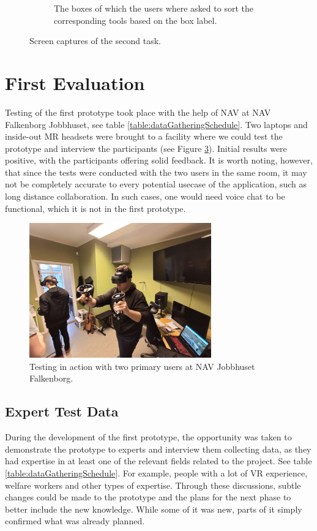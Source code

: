 \begin{figure}[]
\begin{subfigure}[b]{0.65\textwidth}
    \caption{The boxes of which the users where asked to sort the corresponding tools based on the box label.}
    \label{fig:task2SortingBoxes}
  \end{subfigure}
  \hfill%
  \caption{Screen captures of the second task.}
  \label{fig:phase1Capture2}
\end{figure}


\section{First Evaluation}
Testing of the first prototype took place with the help of NAV at NAV Falkenborg Jobbhuset, see table \ref{table:dataGatheringSchedule}. Two laptops and inside-out MR headsets were brought to a facility where we could test the prototype and interview the participants (see Figure \ref{fig:testingPhase1}). Initial results were positive, with the participants offering solid feedback. It is worth noting, however, that since the tests were conducted with the two users in the same room, it may not be completely accurate to every potential usecase of the application, such as long distance collaboration. In such cases, one would need voice chat to be functional, which it is not in the first prototype.

\begin{figure}[H]
  \centering
    \captionsetup{width=.7\linewidth}
    \includegraphics[width=0.7\textwidth]{fig/phase_1/testingPhase1.jpg}
 \caption{Testing in action with two primary users at NAV Jobbhuset Falkenborg.}
\label{fig:testingPhase1}
\end{figure}


\subsection{Expert Test Data}
During the development of the first prototype, the opportunity was taken to demonstrate the prototype to experts and interview them collecting data, as they had expertise in at least one of the relevant fields related to the project. See table \ref{table:dataGatheringSchedule}. For example, people with a lot of VR experience, welfare workers and other types of expertise. Through these discussions, subtle changes could be made to the prototype and the plans for the next phase to better include the new knowledge. While some of it was new, parts of it simply confirmed what was already planned.

